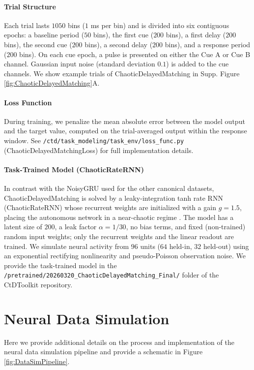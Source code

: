 \documentclass{article}
\begin{document}
\paragraph{Trial Structure}
Each trial lasts $1050$ bins ($1$ ms per bin) and is divided into six contiguous epochs: a baseline period ($50$ bins), the first cue ($200$ bins), a first delay ($200$ bins), the second cue ($200$ bins), a second delay ($200$ bins), and a response period ($200$ bins). On each cue epoch, a pulse is presented on either the Cue A or Cue B channel. Gaussian input noise (standard deviation $0.1$) is added to the cue channels. We show example trials of ChaoticDelayedMatching in Supp. Figure \ref{fig:ChaoticDelayedMatching}A.

\paragraph{Loss Function}
During training, we penalize the mean absolute error between the model output and the target value, computed on the trial-averaged output within the response window. See \texttt{/ctd/task\_modeling/task\_env/loss\_func.py} (ChaoticDelayedMatchingLoss) for full implementation details.

\paragraph{Task-Trained Model (ChaoticRateRNN)}
In contrast with the NoisyGRU used for the other canonical datasets, ChaoticDelayedMatching is solved by a leaky-integration tanh rate RNN (ChaoticRateRNN) whose recurrent weights are initialized with a gain $g = 1.5$, placing the autonomous network in a near-chaotic regime \cite{sussillo2009generating}. The model has a latent size of $200$, a leak factor $\alpha = 1/30$, no bias terms, and fixed (non-trained) random input weights; only the recurrent weights and the linear readout are trained. We simulate neural activity from $96$ units ($64$ held-in, $32$ held-out) using an exponential rectifying nonlinearity and pseudo-Poisson observation noise. We provide the task-trained model in the \texttt{/pretrained/20260320\_ChaoticDelayedMatching\_Final/} folder of the CtDToolkit repository.

\clearpage
\section{Neural Data Simulation \label{appendix:DataSim}}
Here we provide additional details on the process and implementation of the neural data simulation pipeline and provide a schematic in Figure \ref{fig:DataSimPipeline}.
\end{document}
